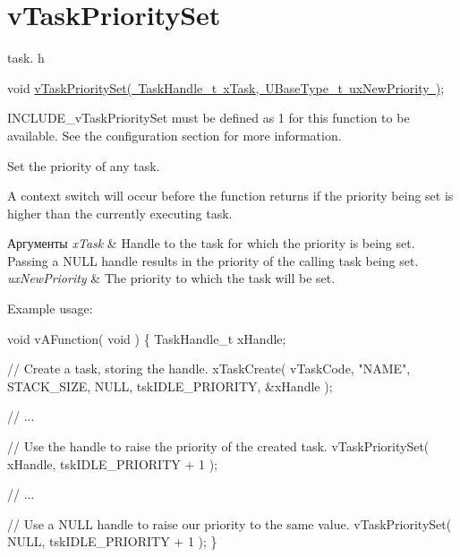 \hypertarget{group__v_task_priority_set}{}\section{v\+Task\+Priority\+Set}
\label{group__v_task_priority_set}
task. h 
\begin{DoxyPre}void \mbox{\hyperlink{task_8h_a1ee31be76e326e0644dbd6ac40a787b6}{vTaskPrioritySet( TaskHandle\_t xTask, UBaseType\_t uxNewPriority )}};\end{DoxyPre}


I\+N\+C\+L\+U\+D\+E\+\_\+v\+Task\+Priority\+Set must be defined as 1 for this function to be available. See the configuration section for more information.

Set the priority of any task.

A context switch will occur before the function returns if the priority being set is higher than the currently executing task.


\begin{DoxyParams}{Аргументы}
{\em x\+Task} & Handle to the task for which the priority is being set. Passing a N\+U\+LL handle results in the priority of the calling task being set.\\
\hline
{\em ux\+New\+Priority} & The priority to which the task will be set.\\
\hline
\end{DoxyParams}
Example usage\+: 
\begin{DoxyPre}
void vAFunction( void )
\{
TaskHandle\_t xHandle;\end{DoxyPre}



\begin{DoxyPre}    // Create a task, storing the handle.
    xTaskCreate( vTaskCode, "NAME", STACK\_SIZE, NULL, tskIDLE\_PRIORITY, \&xHandle );\end{DoxyPre}



\begin{DoxyPre}    // ...\end{DoxyPre}



\begin{DoxyPre}    // Use the handle to raise the priority of the created task.
    vTaskPrioritySet( xHandle, tskIDLE\_PRIORITY + 1 );\end{DoxyPre}



\begin{DoxyPre}    // ...\end{DoxyPre}



\begin{DoxyPre}    // Use a NULL handle to raise our priority to the same value.
    vTaskPrioritySet( NULL, tskIDLE\_PRIORITY + 1 );
\}
  \end{DoxyPre}
 